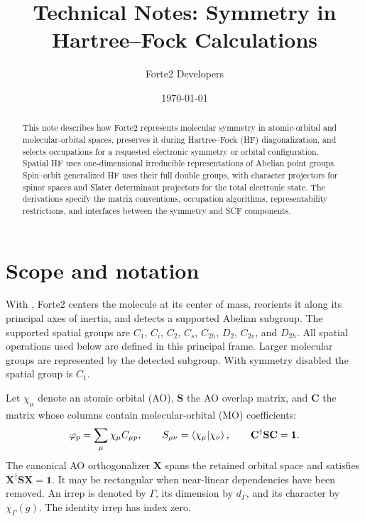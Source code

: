 \documentclass[aip,jcp,preprint,nobibnotes,nofootinbib]{revtex4-1}
\newcommand{\bvec}[1]{\mathbf{#1}}
\newcommand{\Id}{\bvec{1}}
\newcommand{\code}[1]{\texttt{\detokenize{#1}}}
\begin{document}
\title{Technical Notes: Symmetry in Hartree--Fock Calculations}
\author{Forte2 Developers}
\noaffiliation
\date{\today}

\begin{abstract}
This note describes how Forte2 represents molecular symmetry in atomic-orbital
and molecular-orbital spaces, preserves it during Hartree--Fock (HF)
diagonalization, and selects occupations for a requested electronic symmetry
or orbital configuration. Spatial HF uses one-dimensional irreducible
representations of Abelian point groups. Spin--orbit generalized HF uses their
full double groups, with character projectors for spinor spaces and Slater
determinant projectors for the total electronic state. The derivations specify
the matrix conventions, occupation algorithms, representability restrictions,
and interfaces between the symmetry and SCF components.
\end{abstract}

\maketitle

\section{Scope and notation}
\label{sec:scope}

With \code{System(symmetry=True)}, Forte2 centers the molecule at its center of
mass, reorients it along its principal axes of inertia, and detects a supported
Abelian subgroup. The supported spatial groups are $C_1$, $C_i$, $C_2$, $C_s$,
$C_{2h}$, $D_2$, $C_{2v}$, and $D_{2h}$. All spatial operations used below are
defined in this principal frame. Larger molecular groups are represented by
the detected subgroup. With symmetry disabled the spatial group is $C_1$.

Let $\chi_\mu$ denote an atomic orbital (AO), $\bvec{S}$ the AO overlap matrix,
and $\bvec{C}$ the matrix whose columns contain molecular-orbital (MO)
coefficients:
\begin{equation}
 \varphi_p=\sum_\mu\chi_\mu C_{\mu p},\qquad
 S_{\mu\nu}=\braket{\chi_\mu|\chi_\nu},\qquad
 \bvec{C}^\dagger\bvec{S}\bvec{C}=\Id.
 \label{eq:mo}
\end{equation}
The canonical AO orthogonalizer $\bvec{X}$ spans the retained orbital space and
satisfies $\bvec{X}^\dagger\bvec{S}\bvec{X}=\Id$. It may be rectangular when
near-linear dependencies have been removed. An irrep is denoted by $\Gamma$,
its dimension by $d_\Gamma$, and its character by $\chi_\Gamma(g)$. The identity
irrep has index zero.
\end{document}
